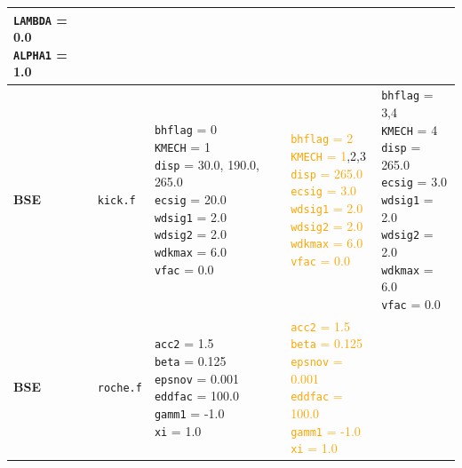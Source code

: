 \begin{table}
\begin{tabular}{|l|l|l|l|l|}
				\makecell{\texttt{LAMBDA} = 0.0 \\ \texttt{ALPHA1} = 1.0} \\
				\hline 
				\textbf{BSE} & 
				\texttt{kick.f} & 
				\makecell{\texttt{bhflag} = 0 \\ \texttt{KMECH} = 1\\ \texttt{disp} = 30.0, 190.0, 265.0 \\ \texttt{ecsig} = 20.0 \\ \texttt{wdsig1} = 2.0 \\ \texttt{wdsig2} = 2.0 \\ \texttt{wdkmax} = 6.0 \\ \texttt{vfac} = 0.0} & 
				\makecell{\textcolor{orange}{\texttt{bhflag} = 2} \\ \textcolor{orange}{\texttt{KMECH} = 1},2,3\\ \textcolor{orange}{\texttt{disp} = 265.0} \\ \textcolor{orange}{\texttt{ecsig} = 3.0} \\ \textcolor{orange}{\texttt{wdsig1} = 2.0} \\ \textcolor{orange}{\texttt{wdsig2} = 2.0} \\ \textcolor{orange}{\texttt{wdkmax} = 6.0} \\ \textcolor{orange}{\texttt{vfac} = 0.0}} &
				\makecell{\texttt{bhflag} = 3,4 \\ \texttt{KMECH} = 4\\ \texttt{disp} = 265.0 \\ \texttt{ecsig} = 3.0 \\ \texttt{wdsig1} = 2.0 \\ \texttt{wdsig2} = 2.0 \\ \texttt{wdkmax} = 6.0 \\ \texttt{vfac} = 0.0} \\
				\hline 
				\textbf{BSE} & 
				\texttt{roche.f} &   
				\makecell{\texttt{acc2} = 1.5 \\ \texttt{beta} = 0.125 \\ \texttt{epsnov} = 0.001 \\ \texttt{eddfac} = 100.0 \\ \texttt{gamm1} = -1.0 \\ \texttt{xi} = 1.0} &
				\makecell{\textcolor{orange}{\texttt{acc2} = 1.5} \\ \textcolor{orange}{\texttt{beta} = 0.125} \\ \textcolor{orange}{\texttt{epsnov} = 0.001} \\ \textcolor{orange}{\texttt{eddfac} = 100.0} \\ \textcolor{orange}{\texttt{gamm1} = -1.0} \\ \textcolor{orange}{\texttt{xi} = 1.0}}  &

\end{tabular}
\end{table}
